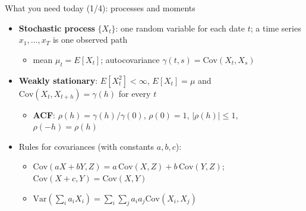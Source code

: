 \begin{frame}{What you need today (1/4): processes and moments}
\itemsize{\small}
\begin{itemize}
    \item \textbf{Stochastic process} $\{X_t\}$: one random variable for each date $t$; a time series $x_1, \dots, x_T$ is one observed path
    \begin{itemize}
        \item mean $\mu_t = E[X_t]$; autocovariance $\gamma(t, s) = \mathrm{Cov}(X_t, X_s)$
    \end{itemize}
    \item \textbf{Weakly stationary}: $E[X_t^2] < \infty$, $E[X_t] = \mu$ and $\mathrm{Cov}(X_t, X_{t+h}) = \gamma(h)$ for every $t$
    \begin{itemize}
        \item \textbf{ACF}: $\rho(h) = \gamma(h)/\gamma(0)$, $\rho(0) = 1$, $|\rho(h)| \le 1$, $\rho(-h) = \rho(h)$
    \end{itemize}
    \item Rules for covariances (with constants $a, b, c$):
    \begin{itemize}
        \item $\mathrm{Cov}(aX + bY, Z) = a\,\mathrm{Cov}(X, Z) + b\,\mathrm{Cov}(Y, Z)$; $\mathrm{Cov}(X + c, Y) = \mathrm{Cov}(X, Y)$
        \item $\mathrm{Var}(\sum_i a_iX_i) = \sum_i\sum_j a_ia_j\mathrm{Cov}(X_i, X_j)$
    \end{itemize}
\end{itemize}
\end{frame}

